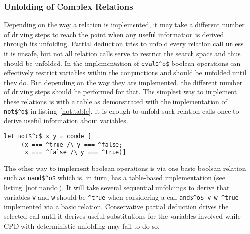 \subsubsection{Unfolding of Complex Relations}

Depending on the way a relation is implemented, it may take a different number of driving steps to reach the point when any useful information is derived through its unfolding.
Partial deduction tries to unfold every relation call unless it is unsafe, but not all relation calls serve to restrict the search space and thus should be unfolded.
In the implementation of \lstinline{eval$^o$} boolean operations can effectively restrict variables within the conjunctions and should be unfolded until they do.
But depending on the way they are implemented, the different number of driving steps should be performed for that.
The simplest way to implement these relations is with a table as demonstrated with the implementation of \lstinline{not$^o$} in listing~\ref{not:table}.
It is enough to unfold such relation calls once to derive useful information about variables.

\begin{figure*}[!h]
  \centering
  \begin{minipage}{0.45\textwidth}
    \begin{lstlisting}[label={not:table}, caption={Implementation of boolean \lstinline{not} as a table}, captionpos=b, frame=tb]
  let not$^o$ x y = conde [
     (x === ^true /\ y === ^false;
      x === ^false /\ y === ^true)]
    \end{lstlisting}
  \end{minipage}
\end{figure*}

The other way to implement boolean operations is via one basic boolean relation such as \lstinline{nand$^o$} which is, in turn, has a table-based implementation (see listing~\ref{not:nando}).
It will take several sequential unfoldings to derive that variables \lstinline{v} and \lstinline{w} should be \lstinline{^true} when considering a call \lstinline{and$^o$ v w ^true} implemented via a basic relation.
Conservative partial deduction drives the selected call until it derives useful substitutions for the variables involved while CPD with deterministic unfolding may fail to do so.

